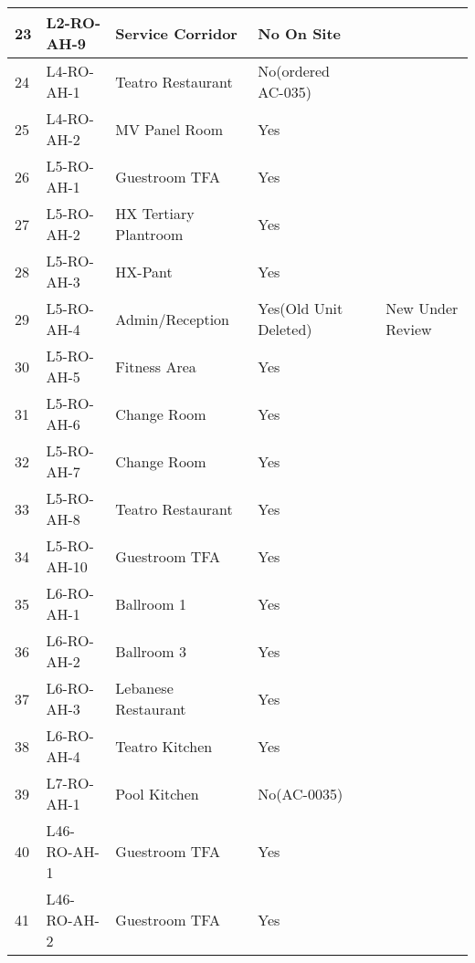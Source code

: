 \begin{table}[htbp]
\begin{tabular}{lll p{2cm}p{.8cm}p{1.8cm}}
 23	 	 &L2-RO-AH-9	 &Service Corridor	 &No	 On Site	 &&\ahutwo\\
\midrule
 24	 	 &L4-RO-AH-1	 &Teatro Restaurant	 &No(ordered	AC-035)	 &&\ahufive\\
 25	 	 &L4-RO-AH-2	 &MV Panel Room	 &Yes	 	   &&                                    \\
\midrule
 26	 	 &L5-RO-AH-1	 &Guestroom TFA	 &Yes	 	   &&                                    \\
 27	 	 &L5-RO-AH-2	 &HX Tertiary Plantroom	 &Yes	 &&	                                      \\
 28	 	 &L5-RO-AH-3	 &HX-Pant	 &Yes	 	               &                                  & \\
 29	 	 &L5-RO-AH-4	 &Admin/Reception	&Yes(Old Unit Deleted) &&  New Under Review	 \\
 30	 	 &L5-RO-AH-5	 &Fitness Area	 &Yes	 	 &&\\
 31	 	 &L5-RO-AH-6	 &Change Room	&Yes	 	 &\\
 32	 	 &L5-RO-AH-7	 &Change Room    	      &Yes	 &&\\	 
 33	 	 &L5-RO-AH-8	 &Teatro Restaurant	 &Yes	 &&\\	 
 34	 	 &L5-RO-AH-10 & Guestroom TFA	 &Yes               &&\\	 	 
\midrule
 35	 	 &L6-RO-AH-1	 &Ballroom 1	 &Yes	 	                     &&\\
 36	 	 &L6-RO-AH-2	 &Ballroom 3	 &Yes	 	                     &&\\
 37	 	 &L6-RO-AH-3	 &Lebanese Restaurant	 &Yes	 	         &&\\
 38	 	 &L6-RO-AH-4	 &Teatro Kitchen	 &Yes	 	         &&\\
\midrule
 39	 	 &L7-RO-AH-1	 &Pool Kitchen	 &No(AC-0035)          & &\ahufive\\
\midrule
 40	 	 &L46-RO-AH-1 &Guestroom TFA	&Yes	 	 &&\\
 41	 	 &L46-RO-AH-2 &Guestroom TFA	 &Yes	 	 &&\\
\bottomrule
\end{tabular}

\end{table}


